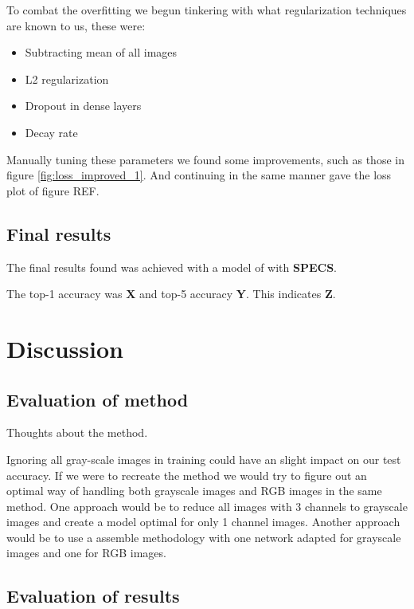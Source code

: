 \documentclass{kthreport}
\begin{document}


To combat the overfitting we begun tinkering with what regularization techniques are known to us, these were:

\begin{itemize}
  \item Subtracting mean of all images
  \item L2 regularization
  \item Dropout in dense layers
  \item Decay rate
\end{itemize}

Manually tuning these parameters we found some improvements, such as those in figure \ref{fig:loss_improved_1}. And continuing in the same manner gave the loss plot of figure REF.



\subsection{Final results}

The final results found was achieved with a model of with \textbf{SPECS}.

The top-1 accuracy was \textbf{X} and top-5 accuracy \textbf{Y}. This indicates \textbf{Z}.

% 

\section{Discussion}

\subsection{Evaluation of method}
Thoughts about the method.

Ignoring all gray-scale images in training could have an slight impact on our test accuracy. If we were to recreate the method we would try to figure out an optimal way of handling both grayscale images and RGB images in the same method. One approach would be to reduce all images with 3 channels to grayscale images and create a model optimal for only 1 channel images. Another approach would be to use a assemble methodology with one network adapted for grayscale images and one for RGB images.

\subsection{Evaluation of results}
\end{document}
